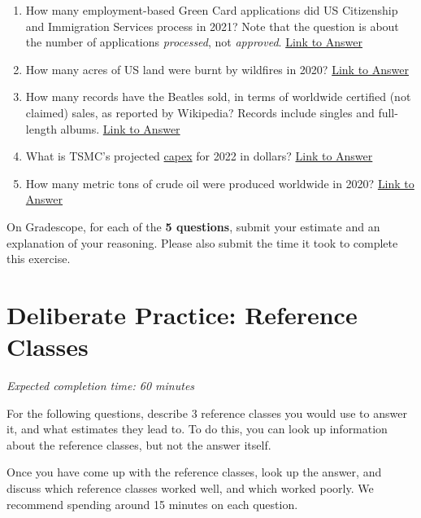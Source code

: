 \documentclass[11pt]{article}
\begin{document}
\begin{enumerate}
	\item How many employment-based Green Card applications did US Citizenship and Immigration Services process in 2021? Note that the question is about the number of applications \emph{processed}, not \emph{approved}. \href{https://www.uscis.gov/newsroom/news-releases/uscis-announces-fy-2021-accomplishments}{Link to Answer}
	\item How many acres of US land were burnt by wildfires in 2020? \href{https://sgp.fas.org/crs/misc/IF10244.pdf}{Link to Answer}
	\item How many records have the Beatles sold, in terms of worldwide certified (not claimed) sales, as reported by Wikipedia? Records include singles and full-length albums. \href{https://en.wikipedia.org/wiki/List_of_best-selling_music_artists#250_million_or_more_records}{Link to Answer}
	\item What is TSMC's projected \href{https://en.wikipedia.org/wiki/Capital\_expenditure}{capex} for 2022 in dollars? \href{https://www.reuters.com/technology/tsmc-q4-profit-rises-164-record-beats-market-forecasts-2022-01-13/}{Link to Answer}
	\item How many metric tons of crude oil were produced worldwide in 2020? \href{https://www.statista.com/statistics/265229/global-oil-production-in-million-metric-tons/#:~:text=In$\%$202020$\%$2C$\%$20global$\%$20crude$\%$20oil,about$\%$204.2$\%$20billion$\%$20metric$\%$20tons}{Link to Answer}
\end{enumerate}

On Gradescope, for each of the \textbf{5 questions}, submit your estimate and an explanation of your reasoning. Please also submit the time it took to complete this exercise.

\section*{Deliberate Practice: Reference Classes}

\emph{Expected completion time: 60 minutes}

For the following questions, describe 3 reference classes you would use to answer it, and what estimates they lead to. To do this, you can look up information about the reference classes, but not the answer itself. 

Once you have come up with the reference classes, look up the answer, and discuss which reference classes worked well, and which worked poorly. We recommend spending around 15 minutes on each question.
\end{document}
